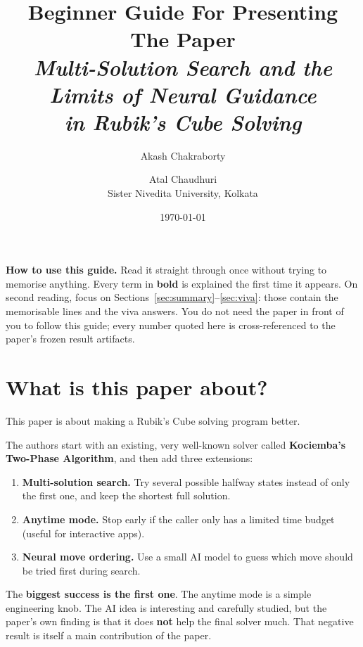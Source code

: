 \documentclass[11pt,a4paper]{article}
\title{\vspace{-1.5em}\LARGE Beginner Guide For Presenting The Paper\\[0.3em]
\large \emph{Multi-Solution Search and the Limits of Neural Guidance\\ in Rubik's Cube Solving}}
\author{\normalsize Akash Chakraborty \and Atal Chaudhuri\\[0.3em]
\small Sister Nivedita University, Kolkata}
\date{\today}
\newcommand{\defn}[1]{\textbf{#1}}
\begin{document}
\maketitle
\thispagestyle{empty}

\begin{framed}
\noindent\small\textbf{How to use this guide.} Read it straight through once
without trying to memorise anything. Every term in \defn{bold} is
explained the first time it appears. On second reading, focus on
Sections~\ref{sec:summary}--\ref{sec:viva}: those contain the memorisable
lines and the viva answers. You do not need the paper in front of you to
follow this guide; every number quoted here is cross-referenced to the
paper's frozen result artifacts.
\end{framed}

\tableofcontents
\bigskip

\section{What is this paper about?}

This paper is about making a Rubik's Cube solving program better.

The authors start with an existing, very well-known solver called
\defn{Kociemba's Two-Phase Algorithm}, and then add three extensions:

\begin{enumerate}[leftmargin=2em]
  \item \textbf{Multi-solution search.} Try several possible halfway
        states instead of only the first one, and keep the shortest full
        solution.
  \item \textbf{Anytime mode.} Stop early if the caller only has a
        limited time budget (useful for interactive apps).
  \item \textbf{Neural move ordering.} Use a small AI model to guess
        which move should be tried first during search.
\end{enumerate}

The \textbf{biggest success is the first one}. The anytime mode is a
simple engineering knob. The AI idea is interesting and carefully
studied, but the paper's own finding is that it does \textbf{not} help
the final solver much. That negative result is itself a main
contribution of the paper.
\end{document}
